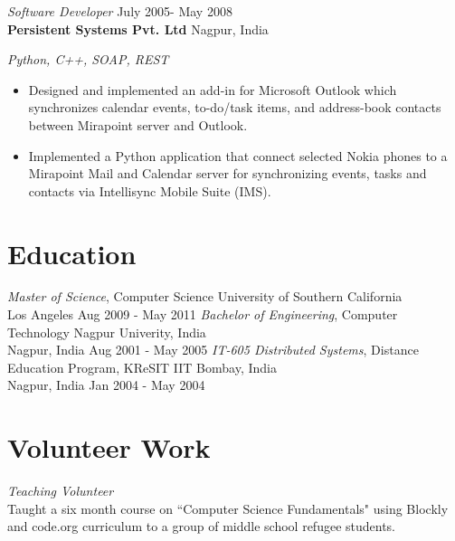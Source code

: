 \documentclass[margin,line]{resume}
\begin{document}
\begin{resume}
{\sl Software Developer } \hfill
     July 2005- May 2008\\
     \textbf{Persistent Systems Pvt. Ltd } \hfill
     Nagpur, India\\[4pt]
{\small\centering\textit{Python, C++, SOAP, REST }\par}\vspace*{-\baselineskip}
\vspace{4pt}
\begin{itemize} \itemsep -2pt %
\small\item Designed and implemented an add-in for Microsoft Outlook which synchronizes calendar events, to-do/task items, and address-book contacts between Mirapoint server and Outlook.
\small\item Implemented a Python application that connect selected Nokia phones to a Mirapoint Mail and Calendar server for synchronizing events, tasks and contacts via Intellisync Mobile Suite (IMS). 
\end{itemize}
\vspace{4pt}
\section{Education}
{\small
  {\sl Master of Science}, Computer Science \hfill
  University of Southern California\\
  Los Angeles \hfill
  Aug 2009 - May 2011
}
\linebreak
\newline
{\small
  {\sl Bachelor of Engineering}, Computer Technology \hfill
  Nagpur Univerity, India\\
  Nagpur, India \hfill
  Aug 2001 - May 2005  
}
\linebreak
\newline
{\small
  {\sl IT-605 Distributed Systems}, Distance Education Program, KReSIT  \hfill
  IIT Bombay, India \\
  Nagpur, India \hfill
  Jan 2004 - May 2004
}
\section{Volunteer Work}

{\small
  {\sl Teaching Volunteer} \\
  Taught a six month course on ``Computer Science Fundamentals" using Blockly and code.org curriculum
  to a group of middle school refugee students.
}

\end{resume}
\end{document}
